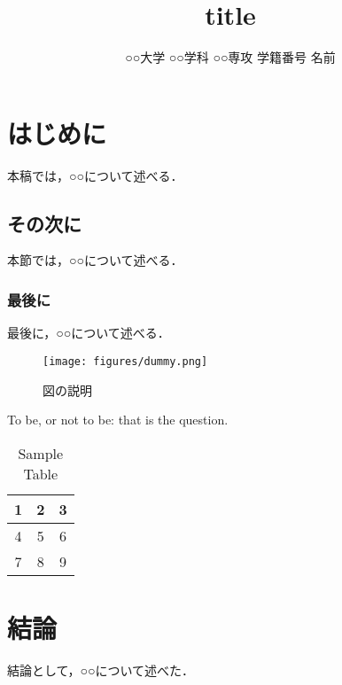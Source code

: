 \documentclass{classes/resume}
\title{
	title
}
\author{
	○○大学 ○○学科 ○○専攻 学籍番号 名前
}
\begin{document}
\maketitle

\section{はじめに}
本稿では，○○について述べる．
\subsection{その次に}
本節では，○○について述べる．
\subsubsection{最後に}
最後に，○○について述べる．

\begin{figure}[htbp]
    \centering
    \texttt{[image: figures/dummy.png]}
    \caption{図の説明 \cite{ref:nomura2022uwb} \cite{ref:青空文庫Aozo22:online}}
    \label{fig:fig1}
\end{figure}


To be, or not to be: that is the question.


\begin{table}[h]
    \centering
    \begin{tabular}{|c|c|c|}
        \hline
        1 & 2 & 3 \\
        \hline
        4 & 5 & 6 \\
        \hline
        7 & 8 & 9 \\
        \hline
    \end{tabular}
    \caption{Sample Table}
    \label{tab:sample}
\end{table}

\section{結論}
結論として，○○について述べた．


\end{document}
